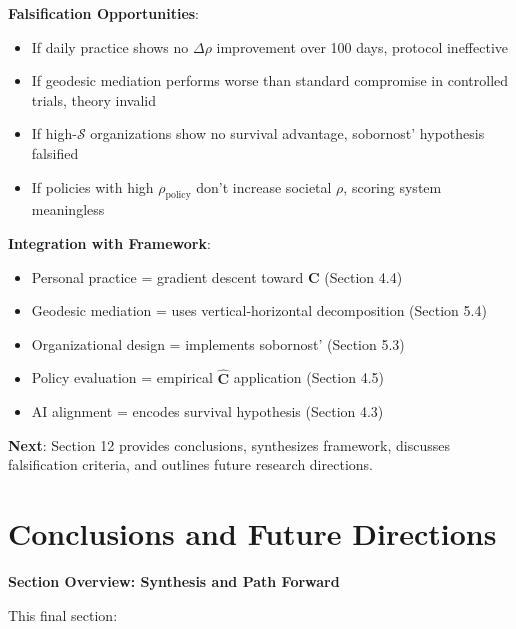\documentclass[11pt,a4paper]{article}
\theoremstyle{definition}
\theoremstyle{remark}
\begin{document}
\begin{small}
\begin{enumerate}
\begin{mdframed}[backgroundcolor=green!10,linewidth=2pt,linecolor=green!70!black]
\textbf{Falsification Opportunities}:
\begin{itemize}[nosep]
    \item If daily practice shows no \(\Delta\rho\) improvement over 100 days, protocol ineffective
    \item If geodesic mediation performs worse than standard compromise in controlled trials, theory invalid
    \item If high-\(\mathcal{S}\) organizations show no survival advantage, sobornost' hypothesis falsified
    \item If policies with high \(\rho_{\text{policy}}\) don't increase societal \(\rho\), scoring system meaningless
\end{itemize}

\textbf{Integration with Framework}:
\begin{itemize}[nosep]
    \item Personal practice = gradient descent toward \(\mathbf{C}\) (Section 4.4)
    \item Geodesic mediation = uses vertical-horizontal decomposition (Section 5.4)
    \item Organizational design = implements sobornost' (Section 5.3)
    \item Policy evaluation = empirical \(\hat{\mathbf{C}}\) application (Section 4.5)
    \item AI alignment = encodes survival hypothesis (Section 4.3)
\end{itemize}

\textbf{Next}: Section 12 provides conclusions, synthesizes framework, discusses falsification criteria, and outlines future research directions.
\end{mdframed}


\section{Conclusions and Future Directions}

\begin{mdframed}[backgroundcolor=cyan!5,linewidth=2pt]
\textbf{Section Overview: Synthesis and Path Forward}

This final section:


\end{mdframed}
\end{enumerate}
\end{small}
\end{document}
